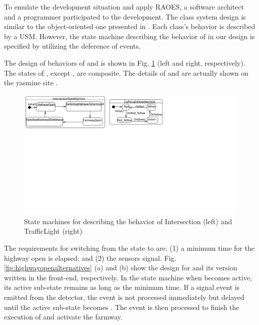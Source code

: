 To emulate the development situation and apply RAOES, a software architect and a programmer participated to the development.
The class system design is similar to the object-oriented one presented in \cite{trafficlight}.
Each class's behavior is described by a USM.
However, the state machine describing the behavior of  in our design is specified by utilizing the deference of events.


The design of behaviors of  and  is shown in Fig. \ref{fig:casestudystatemachine} (left and right, respectively).
The states of , except , are composite.
The details of  and  are actually shown on the yasmine site \cite{farmroadexample}.

\begin{figure}
	\centering
	\includegraphics[clip, trim=0.2cm 13.6cm 11.4cm 0.2cm, width=1.0\columnwidth]{figures/casestudystatemachine}
	\caption{State machines for describing the behavior of Intersection (left) and TrafficLight (right)} 
	\label{fig:casestudystatemachine}
\end{figure}


The requirements for switching from the state  to  are: (1) a minimum time for the highway open is elapsed; and (2) the sensors signal.
Fig. \ref{fig:highwayopenalternatives} (a) and (b) show the design for  and its version written in the front-end, respectively.
In the state machine when  becomes active, its active sub-state remains  as long as the minimum time.
If a signal event  is emitted from the detector, the event is not processed immediately but delayed until the active sub-state becomes .
The event is then processed to finish the execution of  and activate the farmway.

